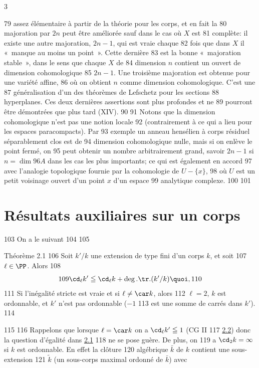 3	\documentclass[10pt]{../fichiers-configuration-latex/smfart}
\begin{document}
    79	assez élémentaire à partir de la théorie pour les corps, et en fait la
    80	majoration par $2n$ peut être améliorée sauf dans le cas où $X$ est
    81	complète: il existe une autre majoration, $2n-1$, qui est vraie chaque
    82	fois que dans $X$ il « manque au moins un point ». Cette dernière
    83	est la bonne « majoration stable », dans le sens que chaque $X$ de
    84	dimension $n$ contient un ouvert de dimension cohomologique
    85	$2n-1$. Une troisième majoration est obtenue pour une variété affine,
    86	où on obtient $n$ comme dimension cohomologique. C'est une
    87	généralisation d'un des théorèmes de Lefschetz pour les sections
    88	hyperplanes. Ces deux dernières assertions sont plus profondes et ne
    89	pourront être démontrées que plus tard (XIV).
    90	
    91	Notons que la dimension cohomologique n'est pas une notion locale
    92	(contrairement à ce qui a lieu pour les espaces paracompacts). Par
    93	exemple un anneau hensélien à corps résiduel séparablement clos est de
    94	dimension cohomologique nulle, mais si on enlève le point fermé, on
    95	peut obtenir un nombre arbitrairement grand, savoir $2n-1$ si $n=\dim
    96	A$ dans les cas les plus importants; ce qui est également en accord
    97	avec l'analogie topologique fournie par la cohomologie de $U-\{x\}$,
    98	où $U$ est un petit voisinage ouvert d'un point $x$ d'un espace
    99	analytique complexe.
   100	
   101	\section{Résultats auxiliaires sur un corps}	
   103	On a le suivant
   104	
   105	\begin{enonce*}{Théorème 2.1}
   106	Soit $k'/k$ une extension de type fini d'un corps $k$, et soit
   107	$\ell\in \PP$. Alors
   108	$$
   109	\cd_{\ell}k'\leqq \cd_{\ell}k+\deg.\tr.(k'/k){\quoi},
   110	$$
   111	Si l'inégalité stricte est vraie et si $\ell\neq \car k$, alors
   112	$\ell=2$, $k$ est ordonnable, et $k'$ n'est pas ordonnable (\ie $-1$
   113	est une somme de carrés dans $k'$).
   114	\end{enonce*}
   115	
   116	Rappelons que lorsque $\ell=\car k$ on a $\cd_{\ell}k'\leqq 1$ (CG II
   117	\hyperref[X.thm2.2]{2.2}) donc la question d'égalité dans \hyperref[X.thm2.1]{2.1} 
   118	ne se pose guère. De plus, on
   119	a $\cd_2k=\infty$ si $k$ est ordonnable. En effet la clôture
   120	algébrique $\bar{k}$ de $k$ contient une sous-extension
   121	$\widetilde{k}$ (un sous-corps maximal ordonné de $\bar{k}$) avec
\end{document}
